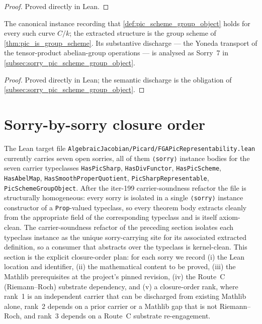\begin{proof}

\leanok
  Proved directly in Lean.
\end{proof}

\begin{definition}
  \label{def:inst_pic_scheme_group_object}
  The canonical instance recording that \cref{def:pic_scheme_group_object}
  holds for every such curve \(C/k\); the extracted structure is the group
  scheme of \cref{thm:pic_is_group_scheme}. Its substantive discharge --- the
  Yoneda transport of the tensor-product abelian-group operations --- is
  analysed as Sorry~7 in \cref{subsec:sorry_pic_scheme_group_object}.
\end{definition}

\begin{proof}

\leanok
  Proved directly in Lean; the semantic discharge is the obligation of
  \cref{subsec:sorry_pic_scheme_group_object}.
\end{proof}

\section{Sorry-by-sorry closure order}
\label{sec:fga_pic_sorry_closure_order}

The Lean target file
\texttt{AlgebraicJacobian/Picard/FGAPicRepresentability.lean} currently
carries seven open sorries, all of them \texttt{⟨sorry⟩} instance
bodies for the seven carrier typeclasses
\texttt{HasPicSharp}, \texttt{HasDivFunctor}, \texttt{HasPicScheme},
\texttt{HasAbelMap}, \texttt{HasSmoothProperQuotient},
\texttt{PicSharpRepresentable}, \texttt{PicSchemeGroupObject}.
After the iter-199 carrier-soundness refactor the file is
structurally homogeneous: every sorry is isolated in a single
\texttt{⟨sorry⟩} instance constructor of a \texttt{Prop}-valued
typeclass, so every theorem body extracts cleanly from the
appropriate field of the corresponding typeclass and is itself
axiom-clean. The carrier-soundness refactor of the
preceding section isolates each typeclass instance as the unique
sorry-carrying site for its associated extracted definition, so a
consumer that abstracts over the typeclass is kernel-clean. This
section is the explicit closure-order plan: for each sorry we record
(i) the Lean location and identifier, (ii) the mathematical content
to be proved, (iii) the Mathlib prerequisites at the project's pinned
revision, (iv) the Route~C (Riemann--Roch) substrate dependency, and
(v) a closure-order rank, where rank~1 is an independent carrier that
can be discharged from existing Mathlib alone, rank~2 depends on a
prior carrier or a Mathlib gap that is not Riemann--Roch, and rank~3
depends on a Route~C substrate re-engagement.

